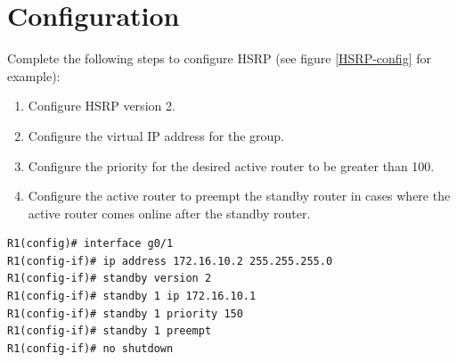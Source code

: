 \section{Configuration}
Complete the following steps to configure HSRP (see figure \ref{HSRP-config} for example):
\begin{enumerate}
    \item Configure HSRP version 2.
    \item Configure the virtual IP address for the group.
    \item Configure the priority for the desired active router to be greater than 100.
    \item Configure the active router to preempt the standby router in cases where the active router comes online after the standby router.
    \end{enumerate}
\begin{verbatim}
R1(config)# interface g0/1
R1(config-if)# ip address 172.16.10.2 255.255.255.0
R1(config-if)# standby version 2
R1(config-if)# standby 1 ip 172.16.10.1
R1(config-if)# standby 1 priority 150
R1(config-if)# standby 1 preempt
R1(config-if)# no shutdown
\end{verbatim}
